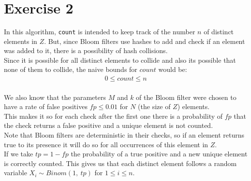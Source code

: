 \documentclass[../main.tex]{subfiles}
\begin{document}
\section{Exercise 2}
\label{sec:ex2}

\paragraph{} In this algorithm, \texttt{count} is intended to keep track of the number \(n\) of distinct elements in \(Z\). But, since Bloom filters use hashes to add and check if an element was added to it, there is a possibility of hash collisions. \\
Since it is possible for all distinct elements to collide and also its possible that none of them to collide, the naive bounds for \(count\) would be:
\begin{align*}
  0 \leq count \leq n
\end{align*}

\paragraph{} We also know that the parameters \(M\) and \(k\) of the Bloom filter were chosen to have a rate of false positives \(fp \leq 0.01\) for \(N\) (the size of \(Z\)) elements. \\
This makes it so for each check after the first one there is a probability of \(fp\) that the check returns a false positive and a unique element is not counted. \\
Note that Bloom filters are deterministic in their checks, so if an element returns true to its presence it will do so for all occurrences of this element in \(Z\). \\ %
If we take \(tp = 1 - fp\) the probability of a true positive and a new unique element is correctly counted. This gives us that each distinct element follows a random variable \(X_{i} \sim Binom(1,\ tp)\) for \(1 \leq i \leq n\).
\end{document}
